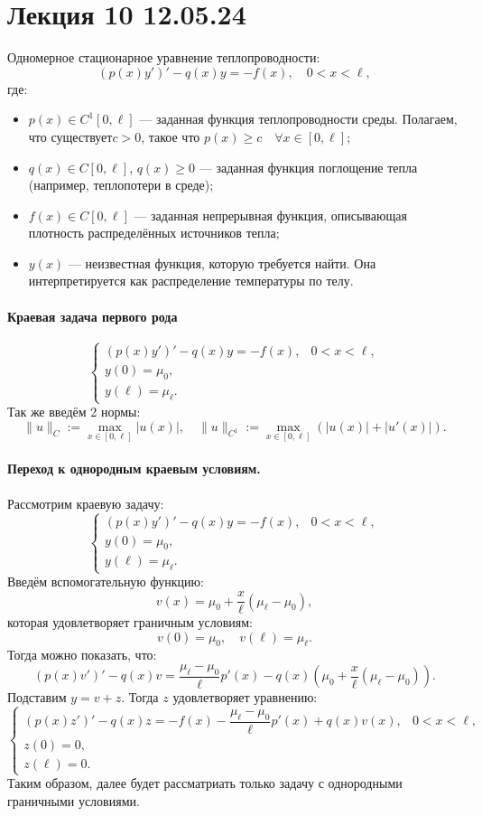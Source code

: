 \section{Лекция 10 12.05.24}

Одномерное стационарное уравнение теплопроводности:
\[
(p(x)y')' - q(x)y = -f(x), \quad 0 < x < \ell,
\]
где:
\begin{itemize}
  \item \( p(x) \in C^1[0,\ell] \) — заданная функция теплопроводности среды. Полагаем, что существует\( c > 0 \), такое что \( p(x) \ge c \quad \forall x \in [0,\ell] \);

  \item \( q(x) \in C[0,\ell] \), \( q(x) \ge 0 \) — заданная функция поглощение тепла (например, теплопотери в среде);

  \item \( f(x) \in C[0,\ell] \) — заданная непрерывная функция, описывающая плотность распределённых источников тепла;

  \item \( y(x) \) — неизвестная функция, которую требуется найти. Она интерпретируется как распределение температуры по телу.
\end{itemize}


\paragraph{Краевая задача первого рода}
\[
\begin{cases}
(p(x)y')' - q(x)y = -f(x), & 0 < x < \ell, \\
y(0) = \mu_0, \\
y(\ell) = \mu_\ell.
\end{cases}
\]
Так же введём 2 нормы:
\[
\|u\|_C := \max_{x \in [0,\ell]} |u(x)|, \quad \|u\|_{C^1} := \max_{x \in [0,\ell]} \left( |u(x)| + |u'(x)| \right).
\]

\paragraph{Переход к однородным краевым условиям.} Рассмотрим краевую задачу:
\[
\begin{cases}
(p(x) y')' - q(x) y = -f(x), & 0 < x < \ell, \\
y(0) = \mu_0, \\
y(\ell) = \mu_\ell.
\end{cases}
\]
Введём вспомогательную функцию:
\[
v(x) = \mu_0 + \frac{x}{\ell}(\mu_\ell - \mu_0),
\]
которая удовлетворяет граничным условиям:
\[
v(0) = \mu_0, \quad v(\ell) = \mu_\ell.
\]
Тогда можно показать, что:
\[
(p(x) v')' - q(x) v = \frac{\mu_\ell - \mu_0}{\ell} p'(x) - q(x)\left(\mu_0 + \frac{x}{\ell}(\mu_\ell - \mu_0)\right).
\]
Подставим \( y = v + z \). Тогда $z$ удовлетворяет уравнению:
\[
\begin{cases}
(p(x) z')' - q(x) z = -f(x) - \dfrac{\mu_\ell - \mu_0}{\ell} p'(x) + q(x) v(x), & 0 < x < \ell, \\
z(0) = 0, \\
z(\ell) = 0.
\end{cases}
\]
Таким образом, далее будет рассматриать только задачу с однородными граничными условиями.


